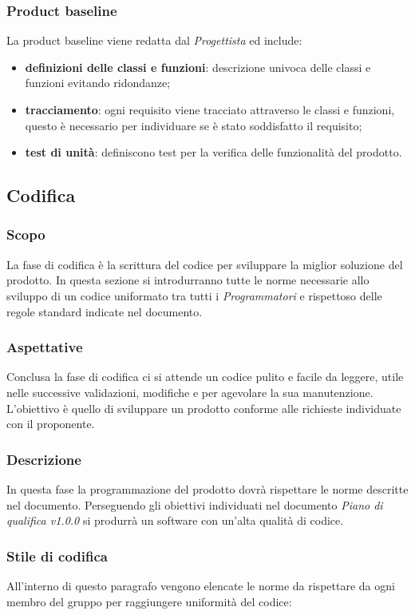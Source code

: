 \subsubsection{Product baseline}
La product baseline viene redatta dal \textit{Progettista} ed include:
\begin{itemize}
	\item \textbf{definizioni delle classi e funzioni}: descrizione univoca delle classi e funzioni evitando ridondanze;
	\item \textbf{tracciamento}: ogni requisito viene tracciato attraverso le classi e funzioni, questo è necessario per individuare se è stato soddisfatto il requisito;
	\item \textbf{test di unità}: definiscono test per la verifica delle funzionalità del prodotto.
\end{itemize}
\subsection{Codifica}

\subsubsection{Scopo}
La fase di codifica è la scrittura del codice per sviluppare la miglior soluzione del prodotto. In questa sezione si introdurranno tutte le norme necessarie allo sviluppo di un codice uniformato tra tutti i \textit{Programmatori} e rispettoso delle regole standard indicate nel documento.
\subsubsection{Aspettative}
Conclusa la fase di codifica ci si attende un codice pulito e facile da leggere, utile nelle successive validazioni, modifiche e per agevolare la sua manutenzione. L'obiettivo è quello di sviluppare un prodotto conforme alle richieste individuate con il proponente. 

\subsubsection{Descrizione}
In questa fase la programmazione del prodotto dovrà rispettare le norme descritte nel documento. Perseguendo gli obiettivi individuati nel documento \textit{Piano di qualifica v1.0.0} si produrrà un software con un'alta qualità di codice.

\subsubsection{Stile di codifica}
All'interno di questo paragrafo vengono elencate le norme da rispettare da ogni membro del gruppo per raggiungere uniformità del codice:


